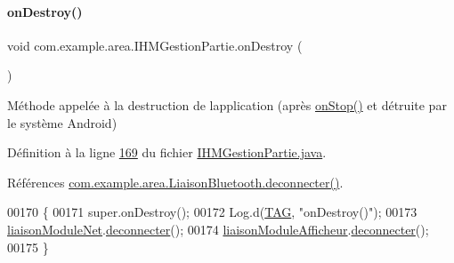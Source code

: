 \paragraph{\texorpdfstring{on\+Destroy()}{onDestroy()}}
{\footnotesize\ttfamily void com.\+example.\+area.\+I\+H\+M\+Gestion\+Partie.\+on\+Destroy (\begin{DoxyParamCaption}{ }\end{DoxyParamCaption})\hspace{0.3cm}{\ttfamily [protected]}}



Méthode appelée à la destruction de l\textquotesingle{}application (après \hyperlink{classcom_1_1example_1_1area_1_1_i_h_m_gestion_partie_a67aa6746480bdba2a5744a2ff8d6c48d}{on\+Stop()} et détruite par le système Android) 



Définition à la ligne \hyperlink{_i_h_m_gestion_partie_8java_source_l00169}{169} du fichier \hyperlink{_i_h_m_gestion_partie_8java_source}{I\+H\+M\+Gestion\+Partie.\+java}.



Références \hyperlink{_liaison_bluetooth_8java_source_l00171}{com.\+example.\+area.\+Liaison\+Bluetooth.\+deconnecter()}.


\begin{DoxyCode}
00170     \{
00171         super.onDestroy();
00172         Log.d(\hyperlink{classcom_1_1example_1_1area_1_1_i_h_m_gestion_partie_a78af1eb84e4a48b7f69c3ebee193933c}{TAG}, \textcolor{stringliteral}{"onDestroy()"});
00173         \hyperlink{classcom_1_1example_1_1area_1_1_i_h_m_gestion_partie_a20e5bc638f1bd45e80bbadca8e8ec28f}{liaisonModuleNet}.\hyperlink{classcom_1_1example_1_1area_1_1_liaison_bluetooth_a10b356586feed95ecacb0a57cb51f0e6}{deconnecter}();
00174         \hyperlink{classcom_1_1example_1_1area_1_1_i_h_m_gestion_partie_a126a48e2f28ff098e20f0efb4700145f}{liaisonModuleAfficheur}.\hyperlink{classcom_1_1example_1_1area_1_1_liaison_bluetooth_a10b356586feed95ecacb0a57cb51f0e6}{deconnecter}();
00175     \}
\end{DoxyCode}
\mbox{\label{classcom_1_1example_1_1area_1_1_i_h_m_gestion_partie_a05a8b1eabc376a9d06150eaed696e53e}} 
